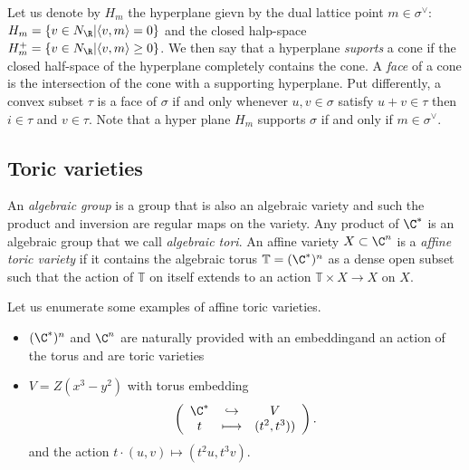 \documentclass{worksheetclass}
\begin{document}
        Let us denote by $H_m$ the hyperplane gievn by the dual lattice point $m\in\sigma^\vee$: $H_m=\{v\in N_\R|\langle v,m\rangle=0\}$ and the closed halp-space $H^+_m=\{v\in N_\R|\langle v,m\rangle\geq0\}$. We then say that a hyperplane \emph{suports} a cone if the closed half-space of the hyperplane completely contains the cone. A \emph{face} of a cone is the intersection of the cone with a supporting hyperplane. Put differently, a convex subset $\tau$ is a face of $\sigma$ if and only whenever $u,v\in\sigma$ satisfy $u+v\in\tau$ then $i\in\tau$ and $v\in\tau$. Note that a hyper plane $H_m$ supports $\sigma$ if and only if $m\in\sigma^\vee$.

    \subsection{Toric varieties}

        An \emph{algebraic group} is a group that is also an algebraic variety and such the product and inversion are regular maps on the variety. Any product of $\C^*$ is an algebraic group that we call \emph{algebraic tori}. An affine variety $X\subset\C^n$ is a \emph{affine toric variety} if it contains the algebraic torus $\mathbb{T}=(\C^*)^n$ as a dense open subset such that the action of $\mathbb{T}$ on itself extends to an action $\mathbb{T}\times X\to X$ on $X$.

        \begin{examp*}
            Let us enumerate some examples of affine toric varieties.
            \begin{itemize}
                \item $(\C^*)^n$ and $\C^n$ are naturally provided with an embeddingand an action of the torus and are toric varieties
                \item $V=Z(x^3-y^2)$ with torus embedding
                \begin{equation}
                    \left(
                    \begin{array}{ccc}
                        \C^* & \hookrightarrow & V \\
                        t & \longmapsto & (t^2,t^3))
                    \end{array}
                    \right).
                \end{equation}
                and the action $t\cdot(u,v)\mapsto(t^2u,t^3v)$.
            \end{itemize}
        \end{examp*}
\end{document}

